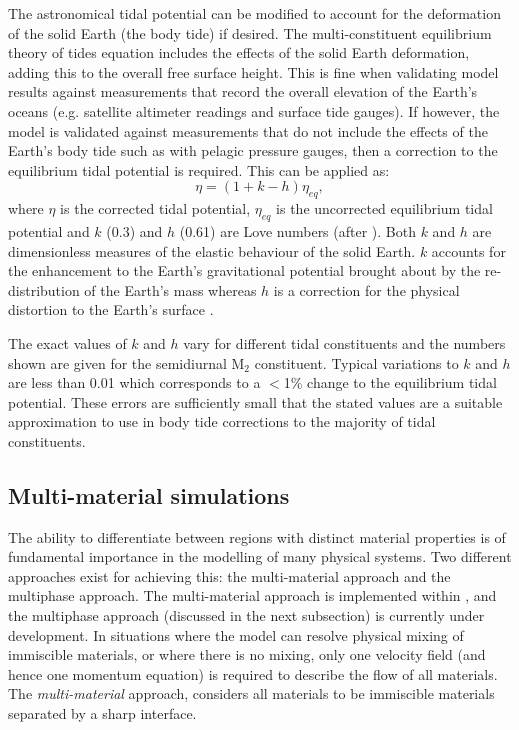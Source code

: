 The astronomical tidal potential can be modified to account for the deformation of the solid Earth
(the body tide) if desired. The multi-constituent equilibrium theory of tides equation includes the effects of the
solid Earth deformation, adding this to the overall free surface height. 
This is fine
when validating model results against measurements that record the overall elevation of the 
Earth's oceans (e.g. satellite altimeter readings and surface tide gauges). If however, the model
is validated against measurements that do not include the effects of the Earth's body tide
such as with pelagic pressure gauges, then a correction to the equilibrium tidal potential
is required. This can be applied as: 
\begin{equation}
\eta=(1+k-h)\eta_{eq},
\label{eq:body-tide}
\end{equation}    
where $\eta$ is the corrected tidal potential, $\eta_{eq}$ is the uncorrected equilibrium tidal potential
and $k$ (0.3) and $h$ (0.61) are Love numbers (after \citealp{Love1909}).
Both $k$ and $h$ are dimensionless measures of the elastic behaviour of the solid Earth. $k$ accounts for the enhancement to the
Earth's gravitational potential brought about by the re-distribution of the Earth's mass whereas $h$
is a correction for the physical distortion to the Earth's surface \citep{Pugh1987}.

The exact values of $k$ and $h$ vary for different tidal constituents and the numbers shown are given
for the semidiurnal M$_{\text{2}}$ constituent. Typical variations to $k$ and $h$ are less than 0.01 which
corresponds to a $<$1\% change to the equilibrium tidal potential.
These errors are sufficiently small that the stated values are a suitable approximation to
use in body tide corrections to the majority of tidal constituents.

\subsection{Multi-material simulations}
The ability to differentiate between regions with distinct material properties is of fundamental importance in the modelling of many physical systems. Two different approaches exist for achieving this: the multi-material approach and the multiphase approach. The multi-material approach is implemented within \fluidity, and the multiphase approach (discussed in the next subsection) is currently under development.
In situations where the model can resolve physical mixing of immiscible materials, or where there is no mixing, only one velocity field (and hence one momentum equation) is required to describe the flow of all materials. The \emph{multi-material} approach, considers all materials to be immiscible materials separated by a sharp interface.

